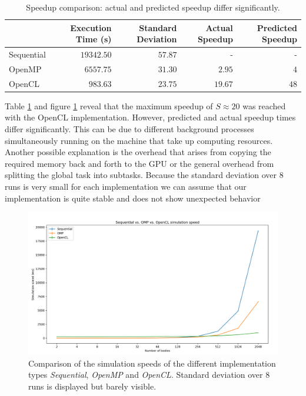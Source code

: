 \documentclass[a4paper,11pt]{scrartcl} %
\begin{document}
\renewcommand{\arraystretch}{1.3}
\begin{table}[h!]
  \begin{tabular}{l|rrrr}
    & Execution Time (s) & Standard Deviation &  Actual Speedup & Predicted Speedup \\ \hline
    Sequential & $19342.50$ & $57.87$ & - & -\\
    OpenMP & $6557.75$ & $31.30$ & $2.95$ & $4$\\
    OpenCL & $983.63$ & $23.75$ & $19.67$ & $48$
  \end{tabular}
  \caption{Speedup comparison: actual and predicted speedup differ significantly.}
  \label{table:speedup}
\end{table}

Table \ref{table:speedup} and figure \ref{fig:benchmark_compare} reveal that the maximum speedup of $S\approx 20$ was reached with the OpenCL implementation. However, predicted and actual speedup times differ significantly. This can be due to different background processes simultaneously running on the machine that take up computing resources. Another possible explanation is the overhead that arises from copying the required memory back and forth to the GPU or the general overhead from splitting the global task into subtasks. Because the standard deviation over 8 runs is very small for each implementation we can assume that our implementation is quite stable and does not show unexpected behavior

\begin{figure}[h!]
  \centering
  \includegraphics[width=\textwidth]{img/benchmark_compare.png}
  \caption{Comparison of the simulation speeds of the different implementation types \textit{Sequential}, \textit{OpenMP} and \textit{OpenCL}. Standard deviation over 8 runs is displayed but barely visible.}
  \label{fig:benchmark_compare}
\end{figure}
\end{document}
